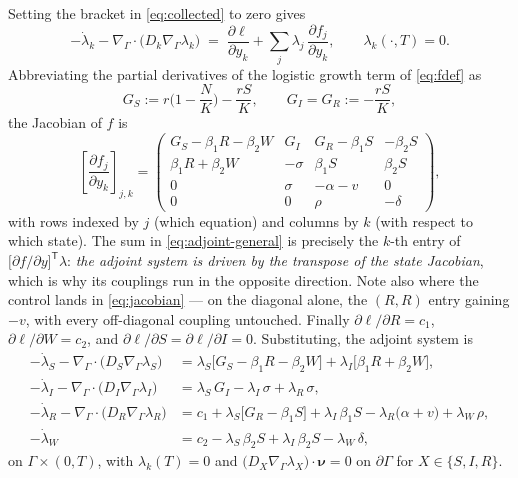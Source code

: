 \documentclass[11pt]{article}
\newcommand{\Grad}{\nabla_\Gamma}
\newcommand{\Div}{\nabla_\Gamma\cdot}
\begin{document}
Setting the bracket in \eqref{eq:collected} to zero gives
\begin{equation}
-\dot\lambda_k - \Div\big(D_k\Grad\lambda_k\big) \;=\; \frac{\partial \ell}{\partial y_k} + \sum_{j}\lambda_j\,\frac{\partial f_j}{\partial y_k},
\qquad \lambda_k(\cdot,T)=0.
\label{eq:adjoint-general}
\end{equation}
Abbreviating the partial derivatives of the logistic growth term of \eqref{eq:fdef} as
\begin{equation}
G_S := r\Big(1-\frac{N}{K}\Big) - \frac{rS}{K},
\qquad
G_I = G_R := -\frac{rS}{K},
\label{eq:Gderivs}
\end{equation}
the Jacobian of $f$ is
\begin{equation}
\left[\frac{\partial f_j}{\partial y_k}\right]_{j,k}
=
\begin{pmatrix}
G_S - \beta_1 R - \beta_2 W & G_I & G_R - \beta_1 S & -\beta_2 S\\[2pt]
\beta_1 R + \beta_2 W & -\sigma & \beta_1 S & \beta_2 S\\[2pt]
0 & \sigma & -\alpha - v & 0\\[2pt]
0 & 0 & \rho & -\delta
\end{pmatrix},
\label{eq:jacobian}
\end{equation}
with rows indexed by $j$ (which equation) and columns by $k$ (with respect to which state). The sum in \eqref{eq:adjoint-general} is precisely the $k$-th entry of $\big[\partial f/\partial y\big]^{\mathsf T}\lambda$: \emph{the adjoint system is driven by the transpose of the state Jacobian}, which is why its couplings run in the opposite direction. Note also where the control lands in \eqref{eq:jacobian} --- on the diagonal alone, the $(R,R)$ entry gaining $-v$, with every off-diagonal coupling untouched. Finally $\partial\ell/\partial R = c_1$, $\partial\ell/\partial W = c_2$, and $\partial\ell/\partial S = \partial\ell/\partial I = 0$. Substituting, the adjoint system is
\begin{align}
-\dot\lambda_S - \Div\big(D_S\Grad\lambda_S\big) &= \lambda_S\big[G_S - \beta_1 R - \beta_2 W\big] + \lambda_I\big[\beta_1 R + \beta_2 W\big], \label{eq:adjS}\\
-\dot\lambda_I - \Div\big(D_I\Grad\lambda_I\big) &= \lambda_S\,G_I - \lambda_I\,\sigma + \lambda_R\,\sigma, \label{eq:adjI}\\
-\dot\lambda_R - \Div\big(D_R\Grad\lambda_R\big) &= c_1 + \lambda_S\big[G_R - \beta_1 S\big] + \lambda_I\,\beta_1 S - \lambda_R\big(\alpha + v\big) + \lambda_W\,\rho, \label{eq:adjR}\\
-\dot\lambda_W &= c_2 - \lambda_S\,\beta_2 S + \lambda_I\,\beta_2 S - \lambda_W\,\delta, \label{eq:adjW}
\end{align}
on $\Gamma\times(0,T)$, with $\lambda_k(T)=0$ and $\big(D_X\Grad\lambda_X\big)\cdot\boldsymbol\nu=0$ on $\partial\Gamma$ for $X\in\{S,I,R\}$.
\end{document}
